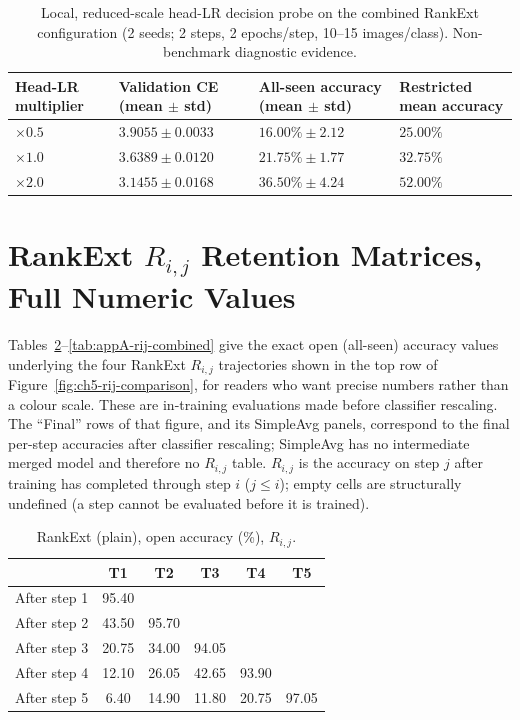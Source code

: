 \begin{table}[htbp]
\centering
\begin{tabularx}{\textwidth}{@{}X X X X@{}}
\toprule
\textbf{Head-LR multiplier} & \textbf{Validation CE (mean $\pm$ std)} & \textbf{All-seen accuracy (mean $\pm$ std)} & \textbf{Restricted mean accuracy} \\
\midrule
$\times0.5$ & $3.9055 \pm 0.0033$ & $16.00\% \pm 2.12$ & $25.00\%$ \\
$\times1.0$ & $3.6389 \pm 0.0120$ & $21.75\% \pm 1.77$ & $32.75\%$ \\
$\times2.0$ & $3.1455 \pm 0.0168$ & $36.50\% \pm 4.24$ & $52.00\%$ \\
\bottomrule
\end{tabularx}
\caption[Local head-LR decision probe]{Local, reduced-scale head-LR
decision probe on the combined RankExt configuration (2 seeds; 2 steps, 2
epochs/step, 10--15 images/class). Non-benchmark diagnostic evidence.}
\label{tab:appA-lr-probe}
\end{table}

\section{RankExt $R_{i,j}$ Retention Matrices, Full Numeric Values}
\label{sec:appA-rij}

Tables~\ref{tab:appA-rij-plain}--\ref{tab:appA-rij-combined} give the exact
open (all-seen) accuracy values underlying the four RankExt $R_{i,j}$
trajectories shown in the top row of Figure~\ref{fig:ch5-rij-comparison},
for readers who want precise numbers rather than a colour scale. These are
in-training evaluations made before classifier rescaling. The ``Final''
rows of that figure, and its SimpleAvg panels, correspond to the final
per-step accuracies after classifier rescaling; SimpleAvg has no
intermediate merged model and therefore no $R_{i,j}$ table. $R_{i,j}$ is the accuracy on step $j$ after
training has completed through step $i$ ($j \le i$); empty cells are
structurally undefined (a step cannot be evaluated before it is trained).

\begin{table}[htbp]
\centering
\begin{tabular}{@{}l ccccc@{}}
\toprule
 & T1 & T2 & T3 & T4 & T5 \\
\midrule
After step 1 & 95.40 & & & & \\
After step 2 & 43.50 & 95.70 & & & \\
After step 3 & 20.75 & 34.00 & 94.05 & & \\
After step 4 & 12.10 & 26.05 & 42.65 & 93.90 & \\
After step 5 & 6.40 & 14.90 & 11.80 & 20.75 & 97.05 \\
\bottomrule
\end{tabular}
\caption[$R_{i,j}$ matrix -- RankExt plain]{RankExt (plain), open accuracy
(\%), $R_{i,j}$.}
\label{tab:appA-rij-plain}
\end{table}

